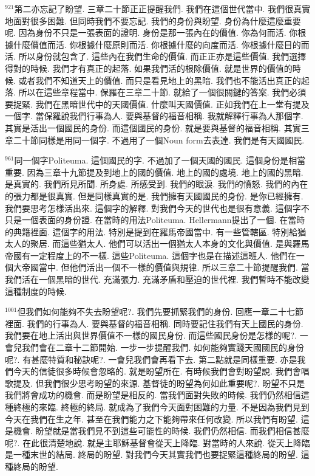 \documentclass{book}
\begin{document}
$^{921}$第二亦忘記了盼望.
三章二十節正正提醒我們.
我們在這個世代當中.
我們很真實地面對很多困難.
但同時我們不要忘記.
我們的身份與盼望.
身份為什麼這麼重要呢.
因為身份不只是一張表面的證明.
身份是那一張內在的價值.
你為何而活.
你根據什麼價值而活.
你根據什麼原則而活.
你根據什麼的向度而活.
你根據什麼目的而活.
所以身份就包含了.
這些內在我們生命的價值.
而正正亦是這些價值.
我們選擇得對的時候.
我們才有真正的起落.
如果我們活的根除價值.
就是世界的價值的時候.
或者我們不知道天上的價值.
而只是看見地上的黑暗.
我們也不能活出真正的起落.
所以在這些章程當中.
保羅在三章二十節.
就給了一個很關鍵的答案.
我們必須要捉緊.
我們在黑暗世代中的天國價值.
什麼叫天國價值.
正如我們在上一堂有提及一個字.
當保羅說我們行事為人.
要與基督的福音相稱.
我就解釋行事為人那個字.
其實是活出一個國民的身份.
而這個國民的身份.
就是要與基督的福音相稱.
其實三章二十節同樣是用同一個字.
不過用了一個Noun form去表達.
我們是有天國國民.

$^{961}$同一個字Politeuma.
這個國民的字.
不過加了一個天國的國民.
這個身份是相當重要.
因為三章十九節提及到地上的國的價值.
地上的國的處境.
地上的國的黑暗.
是真實的.
我們所見所聞.
所身處.
所感受到.
我們的眼淚.
我們的憤怒.
我們的內在的張力都是很真實.
但是同樣真實的是.
我們擁有天國國民的身份.
是你已經擁有.
我們要思考怎樣活出來.
這個字的解釋.
對我們今天的世代也是很有意義.
這個字不只是一個表面的身份證.
在當時的用法Politeuma.
Hellermann提出了一個.
在當時的典籍裡面.
這個字的用法.
特別是提到在羅馬帝國當中.
有一些管轄區.
特別給猶太人的聚居.
而這些猶太人.
他們可以活出一個猶太人本身的文化與價值.
是與羅馬帝國有一定程度上的不一樣.
這些Politeuma.
這個字也是在描述這班人.
他們在一個大帝國當中.
但他們活出一個不一樣的價值與規律.
所以三章二十節提醒我們.
當我們活在一個黑暗的世代.
充滿張力.
充滿矛盾和壓迫的世代裡.
我們暫時不能改變這種制度的時候.

$^{1001}$但我們如何能夠不失去盼望呢?.
我們先要抓緊我們的身份.
回應一章二十七節裡面.
我們的行事為人.
要與基督的福音相稱.
同時要記住我們有天上國民的身份.
我們要在地上活出與世界價值不一樣的國民身份.
而這些國民身份是怎樣的呢?.
一會兒我們會在二章十二節開始.
一步一步提醒我們.
如何能夠實踐天國國民的身份呢?.
有甚麼特質和秘訣呢?.
一會兒我們會再看下去.
第二點就是同樣重要.
亦是我們今天的信徒很多時候會忽略的.
就是盼望所在.
有時候我們會對盼望說.
我們會唱歌提及.
但我們很少思考盼望的來源.
基督徒的盼望為何如此重要呢?.
盼望不只是我們將會成功的機會.
而是盼望是相反的.
當我們面對失敗的時候.
我們仍然相信這種終極的來臨.
終極的終局.
就成為了我們今天面對困難的力量.
不是因為我們見到今天在我們在生之年.
甚至在我們能力之下能夠帶來任何改變.
所以我們有盼望.
這是機會.
盼望就是當我們見不到這些可能性的時候.
我們仍然相信.
而我們相信甚麼呢?.
在此很清楚地說.
就是主耶穌基督會從天上降臨.
對當時的人來說.
從天上降臨是一種末世的結局.
終局的盼望.
對我們今天其實我們也要捉緊這種終局的盼望.
這種終局的盼望.
\end{document}
